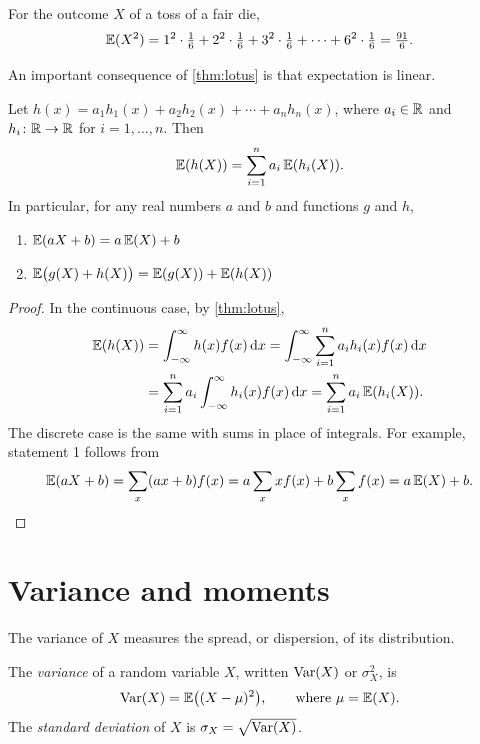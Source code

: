 \begin{example}\label{ex:expected-square-die}
For the outcome $X$ of a toss of a fair die,
\[
  \operatorname{\mathbb{E}}(X^2) = 1^2 \cdot \tfrac16 + 2^2 \cdot \tfrac16 + 3^2 \cdot \tfrac16 + \cdots + 6^2 \cdot \tfrac16 = \tfrac{91}{6}.
\]
\end{example}

An important consequence of \cref{thm:lotus} is that expectation is linear.

\begin{theorem}\label{thm:linearity-single}
Let $h(x) = a_1 h_1(x) + a_2 h_2(x) + \cdots + a_n h_n(x)$, where $a_i \in \mathbb{R}$ and $h_i \colon \mathbb{R} \to \mathbb{R}$ for $i = 1, \ldots, n$. Then
\[
  \operatorname{\mathbb{E}}(h(X)) = \sum_{i=1}^n a_i \operatorname{\mathbb{E}}(h_i(X)).
\]
In particular, for any real numbers $a$ and $b$ and functions $g$ and $h$,
\begin{enumerate}
  \item $\operatorname{\mathbb{E}}(aX + b) = a \operatorname{\mathbb{E}}(X) + b$
  \item $\operatorname{\mathbb{E}}\bigl(g(X) + h(X)\bigr) = \operatorname{\mathbb{E}}(g(X)) + \operatorname{\mathbb{E}}(h(X))$
\end{enumerate}
\end{theorem}

\begin{proof}
In the continuous case, by \cref{thm:lotus},
\begin{align*}
  \operatorname{\mathbb{E}}(h(X)) &= \int_{-\infty}^{\infty} h(x) f(x) \mathop{}\!\mathrm{d} x = \int_{-\infty}^{\infty} \sum_{i=1}^n a_i h_i(x) f(x) \mathop{}\!\mathrm{d} x \\
  &= \sum_{i=1}^n a_i \int_{-\infty}^{\infty} h_i(x) f(x) \mathop{}\!\mathrm{d} x = \sum_{i=1}^n a_i \operatorname{\mathbb{E}}(h_i(X)).
\end{align*}
The discrete case is the same with sums in place of integrals. For example, statement 1 follows from
\[
  \operatorname{\mathbb{E}}(aX + b) = \sum_x (ax + b) f(x) = a \sum_x x f(x) + b \sum_x f(x) = a \operatorname{\mathbb{E}}(X) + b. \qedhere
\]
\end{proof}

\section{Variance and moments}\label{sec:variance-moments}

The variance of $X$ measures the spread, or dispersion, of its distribution.

\begin{definition}\label{def:variance}
The \emph{variance} of a random variable $X$, written $\operatorname{Var}(X)$ or $\sigma_X^2$, is
\[
  \operatorname{Var}(X) = \operatorname{\mathbb{E}}\bigl((X - \mu)^2\bigr), \qquad \text{where } \mu = \operatorname{\mathbb{E}}(X).
\]
The \emph{standard deviation} of $X$ is $\sigma_X = \sqrt{\operatorname{Var}(X)}$.
\end{definition}

